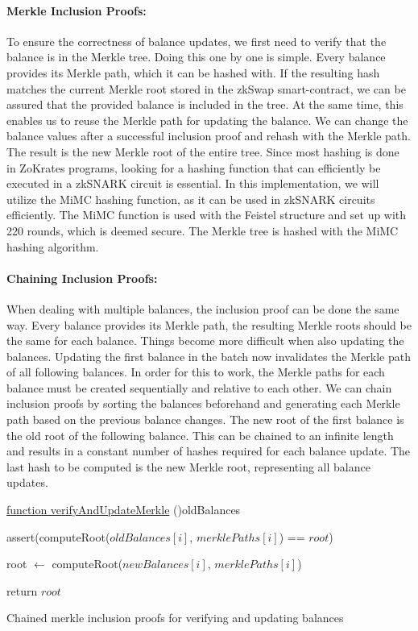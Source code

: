 \documentclass[../../thesis.tex]{subfiles}
\begin{document}
\paragraph{Merkle Inclusion Proofs:}
To ensure the correctness of balance updates, we first need to verify that the balance is in the Merkle tree. Doing this one by one is simple. Every balance provides its Merkle path, which it can be hashed with. If the resulting hash matches the current Merkle root stored in the zkSwap smart-contract, we can be assured that the provided balance is included in the tree. At the same time, this enables us to reuse the Merkle path for updating the balance. We can change the balance values after a successful inclusion proof and rehash with the Merkle path. The result is the new Merkle root of the entire tree. Since most hashing is done in ZoKrates programs, looking for a hashing function that can efficiently be executed in a zkSNARK circuit is essential. In this implementation, we will utilize the MiMC \cite{albrecht2016mimc} hashing function, as it can be used in zkSNARK circuits efficiently. The MiMC function is used with the Feistel structure and set up with 220 rounds, which is deemed secure. The Merkle tree is hashed with the MiMC hashing algorithm. 

\paragraph{Chaining Inclusion Proofs:} \label{chain_inclusion}
When dealing with multiple balances, the inclusion proof can be done the same way. Every balance provides its Merkle path, the resulting Merkle roots should be the same for each balance. Things become more difficult when also updating the balances. Updating the first balance in the batch now invalidates the Merkle path of all following balances. In order for this to work, the Merkle paths for each balance must be created sequentially and relative to each other. We can chain inclusion proofs by sorting the balances beforehand and generating each Merkle path based on the previous balance changes. The new root of the first balance is the old root of the following balance. This can be chained to an infinite length and results in a constant number of hashes required for each balance update. The last hash to be computed is the new Merkle root, representing all balance updates.


\begin{algorithm}

    \underline{function verifyAndUpdateMerkle}\;
    \ForEach(){oldBalances}
    {
        assert(computeRoot($oldBalances[i]$, $merklePaths[i]$) == $root$)

        root $\gets$ computeRoot($newBalances[i]$, $merklePaths[i]$)
    }

    return $root$

    \caption{Chained merkle inclusion proofs for verifying and updating balances}
\end{algorithm}
\end{document}

